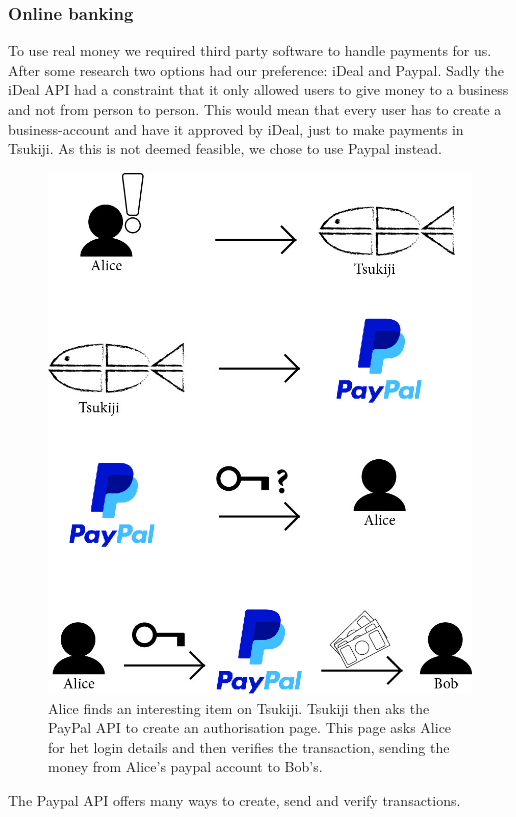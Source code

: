 \subsubsection{Online banking}
To use real money we required third party software to handle payments for us. 
After some research two options had our preference: iDeal and Paypal.
Sadly the iDeal API had a constraint that it only allowed users to give money to a business and not from person to person.
This would mean that every user has to create a business-account and have it approved by iDeal, just to make payments in Tsukiji.
As this is not deemed feasible, we chose to use Paypal instead.
\begin{figure}[H]
  \centering
  \includegraphics[width=\linewidth]{paypal-payment}
  \caption{Alice finds an interesting item on Tsukiji. Tsukiji then aks the PayPal API to create an authorisation page. This page asks Alice for het login details and then verifies the transaction, sending the money from Alice's paypal account to Bob's.}
  \label{paypal_pay}
\end{figure}
\newpage
The Paypal API offers many ways to create, send and verify transactions.
